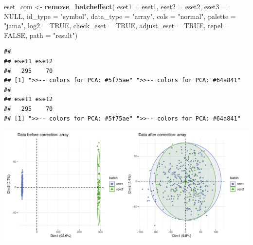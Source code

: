 \documentclass[
  12pt,
]{book}
\newenvironment{Shaded}{\begin{snugshade}}{\end{snugshade}}
\newcommand{\AttributeTok}[1]{\textcolor[rgb]{0.13,0.29,0.53}{#1}}
\newcommand{\ConstantTok}[1]{\textcolor[rgb]{0.56,0.35,0.01}{#1}}
\newcommand{\FunctionTok}[1]{\textcolor[rgb]{0.13,0.29,0.53}{\textbf{#1}}}
\newcommand{\NormalTok}[1]{#1}
\newcommand{\OtherTok}[1]{\textcolor[rgb]{0.56,0.35,0.01}{#1}}
\newcommand{\StringTok}[1]{\textcolor[rgb]{0.31,0.60,0.02}{#1}}
\theoremstyle{definition}
\theoremstyle{definition}
\theoremstyle{definition}
\theoremstyle{definition}
\theoremstyle{remark}
\begin{document}
\begin{Shaded}
\begin{Highlighting}[]
\NormalTok{eset\_com }\OtherTok{\textless{}{-}} \FunctionTok{remove\_batcheffect}\NormalTok{( }\AttributeTok{eset1       =}\NormalTok{ eset1,  }
                                \AttributeTok{eset2       =}\NormalTok{ eset2,   }
                                \AttributeTok{eset3       =} \ConstantTok{NULL}\NormalTok{,}
                                \AttributeTok{id\_type     =} \StringTok{"symbol"}\NormalTok{,}
                                \AttributeTok{data\_type   =} \StringTok{"array"}\NormalTok{, }
                                \AttributeTok{cols        =} \StringTok{"normal"}\NormalTok{, }
                                \AttributeTok{palette     =} \StringTok{"jama"}\NormalTok{, }
                                \AttributeTok{log2        =} \ConstantTok{TRUE}\NormalTok{, }
                                \AttributeTok{check\_eset  =} \ConstantTok{TRUE}\NormalTok{,}
                                \AttributeTok{adjust\_eset =} \ConstantTok{TRUE}\NormalTok{,}
                                \AttributeTok{repel       =} \ConstantTok{FALSE}\NormalTok{,}
                                \AttributeTok{path        =} \StringTok{"result"}\NormalTok{)}
\end{Highlighting}
\end{Shaded}

\begin{verbatim}
## 
## eset1 eset2 
##   295    70 
## [1] ">>-- colors for PCA: #5f75ae" ">>-- colors for PCA: #64a841"
## 
## eset1 eset2 
##   295    70 
## [1] ">>-- colors for PCA: #5f75ae" ">>-- colors for PCA: #64a841"
\end{verbatim}

\begin{center}\includegraphics{_main_files/figure-latex/unnamed-chunk-17-1} \end{center}
\end{document}
